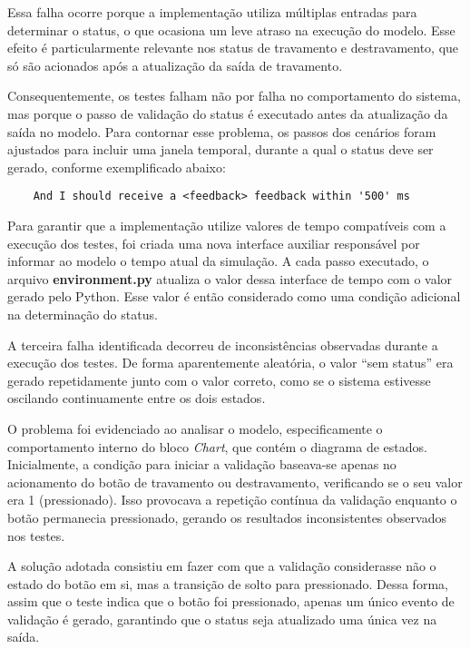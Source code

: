 Essa falha ocorre porque a implementação utiliza múltiplas entradas para determinar o status, o que ocasiona um leve atraso na execução do modelo. Esse efeito é 
particularmente relevante nos status de travamento e destravamento, que só são acionados após a atualização da saída de travamento.

Consequentemente, os testes falham não por falha no comportamento do sistema, mas porque o passo de validação do status é executado antes da atualização da saída no 
modelo. Para contornar esse problema, os passos dos cenários foram ajustados para incluir uma janela temporal, durante a qual o status deve ser gerado, conforme 
exemplificado abaixo:

\begin{verbatim}
	And I should receive a <feedback> feedback within '500' ms
\end{verbatim}


Para garantir que a implementação utilize valores de tempo compatíveis com a execução dos testes, foi criada uma nova interface auxiliar responsável por informar ao 
modelo o tempo atual da simulação. A cada passo executado, o arquivo \textbf{environment.py} atualiza o valor dessa interface de tempo com o valor gerado pelo Python. 
Esse valor é então considerado como uma condição adicional na determinação do status.

A terceira falha identificada decorreu de inconsistências observadas durante a execução dos testes. De forma aparentemente aleatória, o valor ``sem status'' era gerado 
repetidamente junto com o valor correto, como se o sistema estivesse oscilando continuamente entre os dois estados.

O problema foi evidenciado ao analisar o modelo, especificamente o comportamento interno do bloco \textit{Chart}, que contém o diagrama de estados. Inicialmente, a 
condição para iniciar a validação baseava-se apenas no acionamento do botão de travamento ou destravamento, verificando se o seu valor era 1 (pressionado). Isso 
provocava a repetição contínua da validação enquanto o botão permanecia pressionado, gerando os resultados inconsistentes observados nos testes.

A solução adotada consistiu em fazer com que a validação considerasse não o estado do botão em si, mas a transição de solto para pressionado. Dessa forma, assim que o 
teste indica que o botão foi pressionado, apenas um único evento de validação é gerado, garantindo que o status seja atualizado uma única vez na saída.


